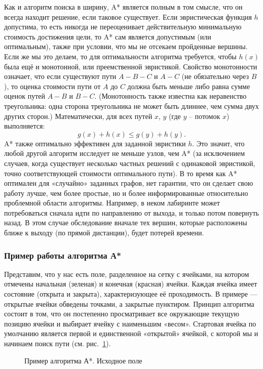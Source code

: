 Как и алгоритм поиска в ширину, A* является полным в том смысле, что он всегда находит решение, если таковое существует.
Если эвристическая функция $h$ допустима, то есть никогда не переоценивает действительную минимальную стоимость достижения цели, то A* сам является допустимым (или оптимальным), также при условии, что мы не отсекаем пройденные вершины. 
Если же мы это делаем, то для оптимальности алгоритма требуется, чтобы $h(x)$ была ещё и монотонной, или преемственной эвристикой.
Свойство монотонности означает, что если существуют пути $A-B-C$ и $A-C$ (не обязательно через $B$), то оценка стоимости пути от $A$ до $C$ должна быть меньше либо равна сумме оценок путей $A-B$ и $B-C$. 
(Монотонность также известна как неравенство треугольника: одна сторона треугольника не может быть длиннее, чем сумма двух других сторон.) 
Математически, для всех путей $x$, $y$ (где $y$ -- потомок $x$) выполняется:
\begin{equation}
 g(x) + h(x) \le g(y) + h(y).
\end{equation}
A* также оптимально эффективен для заданной эвристики $h$. Это значит, что любой другой алгоритм исследует не меньше узлов, чем A* (за исключением случаев, когда существует несколько частных решений с одинаковой эвристикой, точно соответствующей стоимости оптимального пути).
В то время как A* оптимален для «случайно» заданных графов, нет гарантии, что он сделает свою работу лучше, чем более простые, но и более информированные относительно проблемной области алгоритмы. 
Например, в неком лабиринте может потребоваться сначала идти по направлению от выхода, и только потом повернуть назад. 
В этом случае обследование вначале тех вершин, которые расположены ближе к выходу (по прямой дистанции), будет потерей времени.\cite{AI}

\subsubsection{Пример работы алгоритма А*}


Представим, что у нас есть поле, разделенное на сетку с ячейками, на котором отмечены начальная (зеленая) и конечная (красная) ячейки.
Каждая ячейка имеет состояние (открыта и закрыта), характеризующее её проходимость. 
В примере --- открытые ячейки обведены точками, а закрытые пунктиром.
Принцип алгоритма состоит в том, что он постепенно просматривает все окружающие текущую позицию ячейки и выбирает ячейку с наименьшим «весом».
Стартовая ячейка по умолчанию является первой и единственной «открытой» ячейкой, с которой мы и начинаем поиск пути (см. рис.~\ref{ris:astar-1}).
\begin{figure}[ht]
\caption{Пример алгоритма А*. Исходное поле}
\label{ris:astar-1}
\end{figure}

